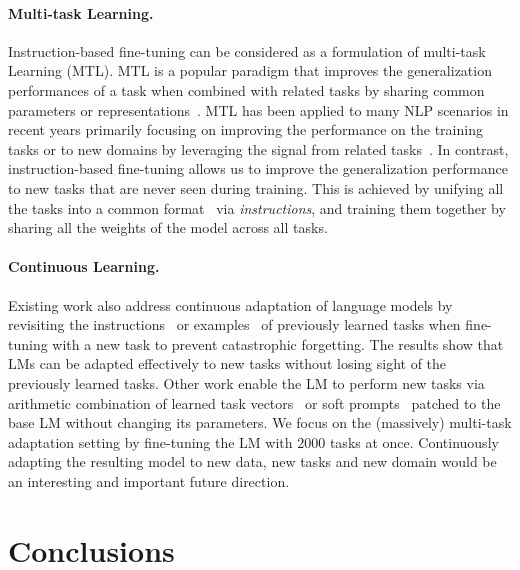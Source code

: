 \paragraph{Multi-task Learning.} Instruction-based fine-tuning can be considered as a formulation of multi-task Learning (MTL). MTL is a popular paradigm that improves the generalization performances of a task when combined with related tasks by sharing common parameters or representations~\citep{caruana1997multitask,kumar2012learning}. MTL has been applied to many NLP scenarios in recent years primarily focusing on improving the performance on the training tasks or to new domains by leveraging the signal from related tasks~\citep{collobert2008unified,mccann2018decathlon,raffel2020t5,vu2020exploring}. In contrast, instruction-based fine-tuning allows us to improve the generalization performance to new tasks that are never seen during training. This is achieved by unifying all the tasks into a common format~\citep{kumar2016askmeanything,khashabi2020unifiedqa} via \emph{instructions}, and training them together by sharing all the weights of the model across all tasks. 

\paragraph{Continuous Learning.} Existing work also address continuous adaptation of language models by revisiting the instructions~\citep{yin2022contintin} or examples~\citep{scialom2022ct0} of previously learned tasks when fine-tuning with a new task to prevent catastrophic forgetting. The results show that LMs can be adapted effectively to new tasks without losing sight of the previously learned tasks. Other work enable the LM to perform new tasks via arithmetic combination of learned task vectors~\citep{ilharco2022taskvector} or soft prompts~\citep{anonymous2023progressiveprompts} patched to the base LM without changing its parameters. We focus on the (massively) multi-task adaptation setting by fine-tuning the LM with 2000 tasks at once. Continuously adapting the resulting model to new data, new tasks and new domain would be an interesting and important future direction.

\section{Conclusions}

